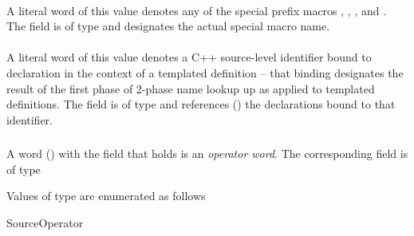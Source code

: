 \paragraph{}  
\label{sec:ifc:SourceLiteral:MsvcStringPrefixMacro}

A literal word of this value denotes any of the special prefix macros
, , , and .
The  field is of type  and designates the actual
special macro name.


\paragraph{}  
\label{sec:ifc:SourceLiteral:MsvcBinding}

A literal word of this value denotes a C++ source-level identifier bound to 
declaration in the context of a templated definition -- that binding designates
the result of the first phase of 2-phase name lookup up as applied to 
templated definitions.   The  field is of type 
and references () the declarations bound 
to that identifier.

\subsubsection{}
\label{sec:ifc:WordSort:Operator}


A word ()  with the  field that holds
 is an \emph{operator word}.  The corresponding 
 field is of type 

Values of type  are enumerated as follows
\begin{Enumeration}{SourceOperator}
\end{Enumeration}

